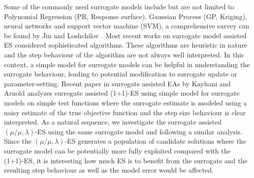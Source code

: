 Some of the commonly used surrogate models include but are not limited to Polynomial Regression (PR, Response surface), Gaussian Process (GP, Kriging), neural networks and support vector machine (SVM), a comprehensive survey can be found by Jin \cite{JIN201161} and Loshchilov \cite{ECJ2016_LMCMA}. Most recent works on surrogate model assisted ES considered sophisticated algorithms. These algorithms are heuristic in nature and the step behaviour of the algorithm are not always well interpreted. In this context, a simple model for surrogate models can be helpful in understanding the surrogate behaviour, leading to potential modification to surrogate update or parameter-setting. Recent paper in surrogate assisted EAs by Kayhani and Arnold \cite{DBLP:conf/ppsn/KayhaniA18} analyzes surrogate assisted (1+1)-ES using simple model for surrogate models on simple test functions where the surrogate estimate is modeled using a noisy estimate of the true objective function and the step size behaviour is clear interpreted. As a natural sequence, we investigate the surrogate assisted $(\mu/\mu,\lambda)$-ES using the same surrogate model and following a similar analysis. Since the $(\mu/\mu,\lambda)$-ES generates a population of candidate solutions where the surrogate model can be potentially more fully exploited compared with the (1+1)-ES, it is interesting how much ES is to benefit from the surrogate and the resulting step behaviour as well as the model error would be affected.






